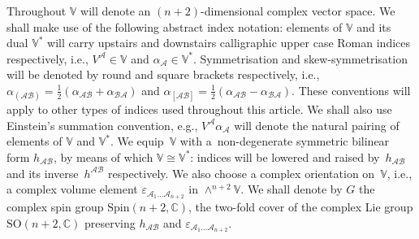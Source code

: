 \documentclass[10pt,a4paper]{amsart}
\numberwithin{equation}{section}
\newcommand{\mc} [1]{\mathcal{#1}}
\newcommand{\Spin} {\mathrm{Spin}}
\newcommand{\SO} {\mathrm{SO}}
\newcommand{\C} {\mathbb{C}}
\newcommand{\V} {\mathbb{V}}
\begin{document}
 Throughout $\V$ will denote an $(n+2)$-dimensional complex vector space. We shall make use of the following abstract index notation: elements of $\V$ and its dual $\V^*$ will carry upstairs and downstairs calligraphic upper case Roman indices respectively, i.e., $V^\mc{A} \in \V$ and \mbox{$\alpha_\mc{A} \in \V^*$}. Symmetrisation and skew-symmetrisation will be denoted by round and square brackets respectively, i.e., $\alpha_{(\mc{A} \mc{B})} = \frac{1}{2} (\alpha_{\mc{A} \mc{B}} + \alpha_{\mc{B} \mc{A}})$ and $\alpha_{[\mc{A} \mc{B}]} = \frac{1}{2} (\alpha_{\mc{A} \mc{B}} - \alpha_{\mc{B} \mc{A}})$. These conventions will apply to other types of indices used throughout this article. We shall also use Einstein's summation convention, e.g., $V^\mc{A} \alpha_\mc{A}$ will denote the natural pairing of elements of $\V$ and $\V^*$. We equip~$\V$ with a~non-degenerate symmetric bilinear form $h_{\mc{A} \mc{B}}$, by means of which $\V \cong \V^*$: indices will be lowered and raised by~$h_{\mc{A} \mc{B}}$ and its inverse~$h^{\mc{A} \mc{B}}$ respectively. We also choose a complex orientation on~$\V$, i.e., a complex volume element $\varepsilon_{\mc{A}_1 \ldots \mc{A}_{n+2}}$ in $\wedge^{n+2} \V$. We shall denote by $G$ the complex spin group $\Spin(n+2,\C)$, the two-fold cover of the complex Lie group $\SO(n+2,\C)$ preserving $h_{\mc{A} \mc{B}}$ and $\varepsilon_{\mc{A}_1 \ldots \mc{A}_{n+2}}$.
\end{document}

